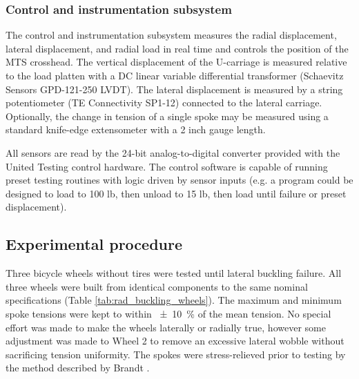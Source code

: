 \documentclass[\rootdir/thesis.tex]{subfiles}
\begin{document}
\subsubsection*{Control and instrumentation subsystem}

The control and instrumentation subsystem measures the radial displacement, lateral displacement, and radial load in real time and controls the position of the MTS crosshead. The vertical displacement of the U-carriage is measured relative to the load platten with a DC linear variable differential transformer (Schaevitz Sensors GPD-121-250 LVDT). The lateral displacement is measured by a string potentiometer (TE Connectivity SP1-12) connected to the lateral carriage. Optionally, the change in tension of a single spoke may be measured using a standard knife-edge extensometer with a 2 inch gauge length.

All sensors are read by the 24-bit analog-to-digital converter provided with the United Testing control hardware. The control software is capable of running preset testing routines with logic driven by sensor inputs (e.g. a program could be designed to load to 100 lb, then unload to 15 lb, then load until failure or preset displacement).

\subsection{Experimental procedure}

Three bicycle wheels without tires were tested until lateral buckling failure. All three wheels were built from identical components to the same nominal specifications (Table \ref{tab:rad_buckling_wheels}). The maximum and minimum spoke tensions were kept to within \SI{+-10}{\percent} of the mean tension. No special effort was made to make the wheels laterally or radially true, however some adjustment was made to Wheel 2 to remove an excessive lateral wobble without sacrificing tension uniformity. The spokes were stress-relieved prior to testing by the method described by Brandt \cite{Brandt1993}.
\end{document}

